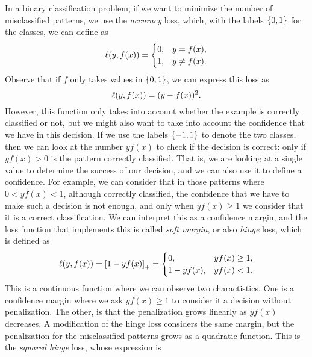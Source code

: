 In a binary classification problem, if we want to minimize the number of misclassified patterns, we use the \emph{accuracy} loss, which, with the labels $\left\{0, 1\right\}$ for the classes, we can define as
\begin{equation}
    \nonumber
    \ell(y, f(x)) =
    \begin{cases}
        0, & y = f(x) ,\\
        1, & y \neq f(x) .
    \end{cases}
\end{equation}
Observe that if $f$ only takes values in $\left\{0, 1\right\}$, we can express this loss as 
\begin{equation}
    \nonumber
    \ell(y, f(x)) = (y - f(x))^2 .
\end{equation}
However, this function only takes into account whether the example is correctly classified or not, but we might also want to take into account the confidence that we have in this decision. If we use the labels $\left\{-1, 1\right\}$ to denote the two classes, then we can look at the number $y f(x)$ to check if the decision is correct: only if $y f(x) > 0$ is the pattern correctly classified. That is, we are looking at a single value to determine the success of our decision, and we can also use it to define a confidence. For example, we can consider that in those patterns where $0 < y f(x) < 1$, although correctly classified, the confidence that we have to make such a decision is not enough, and only when $y f(x) \geq 1$ we consider that it is a correct classification. We can interpret this as a confidence margin, and the loss function that implements this is called \emph{soft margin}, or also \emph{hinge} loss, which is defined as
\begin{equation}
    \label{eq:hinge_def}
    \lossf(y, f(x)) = \pospart{1 - yf(x)} = 
    \begin{cases}
        0, & y f(x) \geq 1 ,\\
        1 - y f(x), & y f(x) < 1 .
    \end{cases}
\end{equation}
This is a continuous function where we can observe two charactistics. One is a confidence margin where we ask $y f(x) \geq 1$ to consider it a decision without penalization. The other, is that the penalization grows linearly as $y f(x)$ decreases.
%
A modification of the hinge loss considers the same margin, but the penalization for the misclassified patterns grows as a quadratic function. This is the \emph{squared hinge} loss, whose expression is

